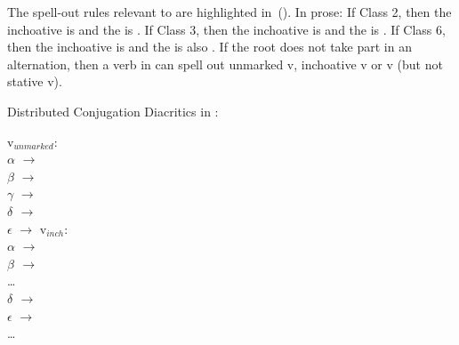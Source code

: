 \begin{exe}
\begin{xlist}
\begin{xlist}
\begin{exe}
\begin{exe}
\begin{xlist}
\begin{exe}
\begin{xlist}
\begin{exe}
\begin{xlist}
\begin{xlist}
\begin{exe}
\begin{xlist}
\begin{exe}
\begin{xlist}
\begin{exe}
\begin{exe}
\begin{exe}
\begin{xlist}
\begin{exe}
\begin{exe}
\begin{xlist}
\begin{xlist}
\begin{exe}
\begin{xlist}
\begin{exe}
\begin{exe}
\begin{exe}
\begin{xlist}
\begin{exe}
\begin{exe}
\begin{xlist}
\begin{exe}
\begin{xlist}
\begin{exe}
\begin{xlist}
\begin{exe}
\begin{xlist}
\begin{exe}
\begin{exe}
\begin{xlist}
\begin{exe}
\begin{exe}
\begin{xlist}
\begin{xlist}
\begin{exe}
\begin{xlist}
\begin{xlist}
\begin{exe}
\begin{xlist}
\begin{exe}
\begin{xlist}
\begin{exe}
\begin{xlist}
\begin{exe}
\begin{xlist}
\begin{exe}
\begin{exe}
\begin{exe}
\begin{exe}
\begin{xlist}
\begin{exe}
\begin{exe}
\begin{xlist}
\begin{xlist}
\begin{exe}
\begin{exe}
\begin{xlist}
The spell-out rules relevant to {\thif} are highlighted in~(\nextx). In prose: If Class 2, then the inchoative is {\tkal} and the  is {\thif}. If Class 3, then the inchoative is {\tnif} and the  is {\thif}. If Class 6, then the inchoative is {\thif} and the  is also {\thif}. If the root does not take part in an alternation, then a verb in {\thif} can spell out unmarked v, inchoative v or  v (but not stative v).
 \begin{exe}
 \ex  Distributed Conjugation Diacritics in \citet[230]{arad05}: \label{ex:arad-classes2} 
 \begin{xlist} 
\begin{multicols}{2}
 	\ex   v$_{unmarked}$: \\
			$ \alpha$ $\rightarrow$ {\tkal} \\
			$\beta$ $\rightarrow$ {\tnif}\\
			$\gamma$ $\rightarrow$ {\tpie}\\
			\textbf{$\delta$ $\rightarrow$ {\thif}}\\
			$\epsilon$ $\rightarrow$ {\thit}
 	\ex  v$_{inch}$: \\
			$ \alpha$ $\rightarrow$ {\tkal} \\
			\textbf{$\beta$ $\rightarrow$ {\tnif}} \\
			\dots \\
			\textbf{$\delta$ $\rightarrow$ {\thif}}\\
			$\epsilon$ $\rightarrow$ {\thit}\\
			\dots \\

\end{multicols}
\end{xlist}
\end{exe}
\end{xlist}
\end{exe}
\end{exe}
\end{xlist}
\end{xlist}
\end{exe}
\end{exe}
\end{xlist}
\end{exe}
\end{exe}
\end{exe}
\end{exe}
\end{xlist}
\end{exe}
\end{xlist}
\end{exe}
\end{xlist}
\end{exe}
\end{xlist}
\end{exe}
\end{xlist}
\end{xlist}
\end{exe}
\end{xlist}
\end{xlist}
\end{exe}
\end{exe}
\end{xlist}
\end{exe}
\end{exe}
\end{xlist}
\end{exe}
\end{xlist}
\end{exe}
\end{xlist}
\end{exe}
\end{xlist}
\end{exe}
\end{exe}
\end{xlist}
\end{exe}
\end{exe}
\end{exe}
\end{xlist}
\end{exe}
\end{xlist}
\end{xlist}
\end{exe}
\end{exe}
\end{xlist}
\end{exe}
\end{exe}
\end{exe}
\end{xlist}
\end{exe}
\end{xlist}
\end{exe}
\end{xlist}
\end{xlist}
\end{exe}
\end{xlist}
\end{exe}
\end{xlist}
\end{exe}
\end{exe}
\end{xlist}
\end{xlist}
\end{exe}
